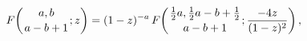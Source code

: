 \[\mathop{F\/}\nolimits\!\left({a,b\atop a-b+1};z\right)=(1-z)^{-a}\mathop{F\/}%
\nolimits\!\left({\frac{1}{2}a,\frac{1}{2}a-b+\frac{1}{2}\atop a-b+1};\frac{-4%
z}{(1-z)^{2}}\right),\]